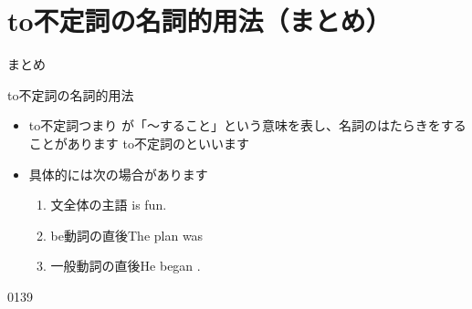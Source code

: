 \documentclass[aspectratio=169,xcolor={dvipsnames,table}]{beamer}
\begin{document}
\section{to不定詞の名詞的用法（まとめ）}
\begin{frame}[plain]{まとめ}
 
\begin{block}{to不定詞の名詞的用法}
\begin{itemize}[square]\small
 \item  to不定詞つまり\,\,が「～すること」という意味を表し、名詞のはたらきをすることがあります%
 \hfill{}to不定詞のといいます
 \item 具体的には次の場合があります
      \begin{enumerate}[circle]
       \item 文全体の主語\hfill{\footnotesize {} is fun.}
       \item be動詞の直後\hfill{\footnotesize The plan was }
       \item 一般動詞の直後\hfill{\footnotesize He began .}
      \end{enumerate}
 \end{itemize}
     \end{block}

\hfill{\tiny 0139}\,{\scriptsize {}}
\end{frame}
\end{document}
